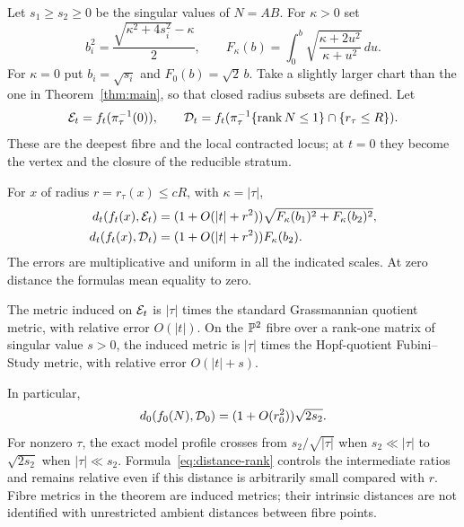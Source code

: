 Let $s_1\ge s_2\ge0$ be the singular values of $N=AB$. For $\kappa>0$ set
\begin{equation}\label{eq:profile-intro}
b_i^2=\frac{\sqrt{\kappa^2+4s_i^2}-\kappa}{2},\qquad
F_\kappa(b)=\int_0^b
\sqrt{\frac{\kappa+2u^2}{\kappa+u^2}}\,du.
\end{equation}
For $\kappa=0$ put $b_i=\sqrt{s_i}$ and $F_0(b)=\sqrt2\,b$.
Take a slightly larger chart than the one in Theorem~\ref{thm:main},
so that closed radius subsets are defined. Let
\[
\mathcal E_t=f_t(\pi_\tau^{-1}(0)),\qquad
\mathcal D_t=f_t(\pi_\tau^{-1}\{\operatorname{rank} N\le1\}\cap\{r_\tau\le R\}).
\]
These are the deepest fibre and the local contracted locus; at $t=0$
they become the vertex and the closure of the reducible stratum.

\begin{theorem}\label{thm:distances}
For $x$ of radius $r=r_\tau(x)\le cR$, with $\kappa=|\tau|$,
\begin{align}
d_t(f_t(x),\mathcal E_t)
&=(1+O(|t|+r^2))
\sqrt{F_\kappa(b_1)^2+F_\kappa(b_2)^2},\label{eq:distance-zero}\\
d_t(f_t(x),\mathcal D_t)
&=(1+O(|t|+r^2))F_\kappa(b_2).\label{eq:distance-rank}
\end{align}
The errors are multiplicative and uniform in all the indicated scales.
At zero distance the formulas mean equality to zero.

The metric induced on $\mathcal E_t$ is $|\tau|$ times the standard
Grassmannian quotient metric, with relative error $O(|t|)$.
On the $\mathbb P^2$ fibre over a rank-one matrix of singular value $s>0$,
the induced metric is $|\tau|$ times the Hopf-quotient Fubini--Study
metric, with relative error $O(|t|+s)$.
\end{theorem}

In particular,
\[
d_0(f_0(N),\mathcal D_0)=(1+O(r_0^2))\sqrt{2s_2}.
\]
For nonzero $\tau$, the exact model profile crosses from
$s_2/\sqrt{|\tau|}$ when $s_2\ll|\tau|$ to $\sqrt{2s_2}$ when
$|\tau|\ll s_2$. Formula~\eqref{eq:distance-rank} controls the
intermediate ratios and remains relative even if this distance is
arbitrarily small compared with $r$. Fibre metrics in the theorem are
induced metrics; their intrinsic distances are not identified with
unrestricted ambient distances between fibre points.


